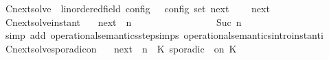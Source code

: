 \begin{isabellebody}
\endisatagproof
{\isafoldproof}%
%
\isadelimproof
\isanewline
%
\endisadelimproof
\isanewline
{}\isamarkupfalse%
\ Cnext{\isacharunderscore}solve\ {\isacharcolon}{\isacharcolon}\ {\isachardoublequoteopen}{\isacharparenleft}{\isacharprime}{\isasymtau}{\isacharcolon}{\isacharcolon}linordered{\isacharunderscore}field{\isacharparenright}\ config\ {\isasymRightarrow}\ {\isacharprime}{\isasymtau}\ config\ set{\isachardoublequoteclose}\ {\isacharparenleft}{\isachardoublequoteopen}{\isasymC}\isactrlsub n\isactrlsub e\isactrlsub x\isactrlsub t\ {\isacharunderscore}{\isachardoublequoteclose}{\isacharparenright}\ \isanewline
\ \ {\isachardoublequoteopen}{\isasymC}\isactrlsub n\isactrlsub e\isactrlsub x\isactrlsub t\ {\isasymS}\ {\isasymequiv}\ {\isacharbraceleft}\ {\isasymS}{\isacharprime}{\isachardot}\ {\isasymS}\ {\isasymhookrightarrow}\ {\isasymS}{\isacharprime}\ {\isacharbraceright}{\isachardoublequoteclose}\isanewline
\isanewline
{}\isamarkupfalse%
\ Cnext{\isacharunderscore}solve{\isacharunderscore}instant{\isacharcolon}\isanewline
\ \ \ {\isachardoublequoteopen}{\isacharparenleft}{\isasymC}\isactrlsub n\isactrlsub e\isactrlsub x\isactrlsub t\ {\isacharparenleft}{\isasymGamma}{\isacharcomma}\ n\ {\isasymturnstile}\ {\isacharbrackleft}{\isacharbrackright}\ {\isasymtriangleright}\ {\isasymPhi}{\isacharparenright}{\isacharparenright}\isanewline
\ \ \ \ \ \ \ \ \ \ {\isasymsupseteq}\ {\isacharbraceleft}\ {\isasymGamma}{\isacharcomma}\ Suc\ n\ {\isasymturnstile}\ {\isasymPhi}\ {\isasymtriangleright}\ {\isacharbrackleft}{\isacharbrackright}\ {\isacharbraceright}{\isachardoublequoteclose}\isanewline
%
\isadelimproof
\ \ %
\endisadelimproof
%
\isatagproof
{}\isamarkupfalse%
\ {\isacharparenleft}simp\ add{\isacharcolon}\ operational{\isacharunderscore}semantics{\isacharunderscore}step{\isachardot}simps\ operational{\isacharunderscore}semantics{\isacharunderscore}intro{\isachardot}instant{\isacharunderscore}i{\isacharparenright}%
\endisatagproof
{\isafoldproof}%
%
\isadelimproof
\isanewline
%
\endisadelimproof
\isanewline
{}\isamarkupfalse%
\ Cnext{\isacharunderscore}solve{\isacharunderscore}sporadicon{\isacharcolon}\isanewline
\ \ \ {\isachardoublequoteopen}{\isacharparenleft}{\isasymC}\isactrlsub n\isactrlsub e\isactrlsub x\isactrlsub t\ {\isacharparenleft}{\isasymGamma}{\isacharcomma}\ n\ {\isasymturnstile}\ {\isacharparenleft}{\isacharparenleft}K\ sporadic\ {\isasymtau}\ on\ K\ {\isacharhash}\ {\isasymPsi}{\isacharparenright}\ {\isasymtriangleright}\ {\isasymPhi}{\isacharparenright}{\isacharparenright}\isanewline

\end{isabellebody}
